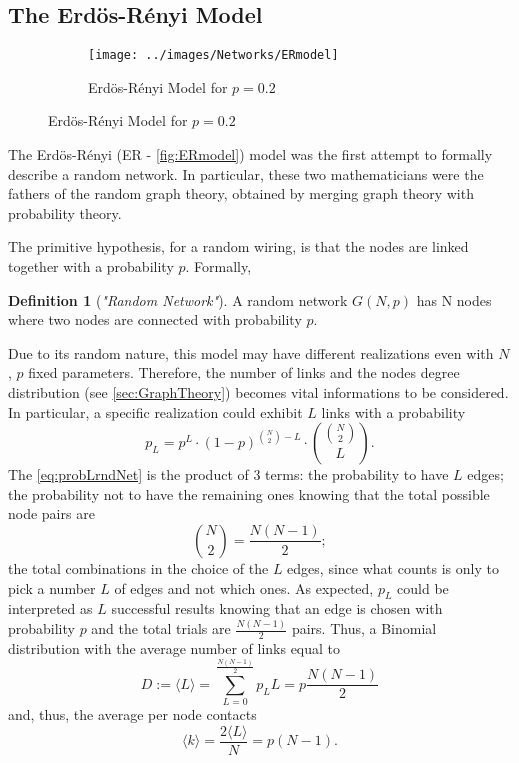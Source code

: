 \documentclass[a4paper,10pt]{book} %
\theoremstyle{definition}
\newtheorem{definition}{Definition}[section]
\begin{document}
\subsection{The Erdös-Rényi Model}
\label{sec:ER_model}

\begin{figure}[ht]
    \begin{subfigure}{\textwidth}
        \texttt{[image: ../images/Networks/ERmodel]}
        \centering
        \caption{Erdös-Rényi Model for $p = 0.2$ \cite{Baronchelli:2017_EpidSpreadCompNets}}
        \label{fig:ERmodel}
    \end{subfigure}
\end{figure}

The Erdös-Rényi (ER - \autoref{fig:ERmodel}) model was the first attempt to formally describe a random network. 
In particular, these two mathematicians were the fathers of the random graph theory, obtained by merging graph theory with probability theory.

The primitive hypothesis, for a random wiring, is that the nodes are linked together with a probability $p$. Formally,

\begin{definition}[\textit{"Random Network"}]
A random network $G(N,p)$ has N nodes where two nodes are connected with probability $p$.
\end{definition} 

Due to its random nature, this model may have different realizations even with $N$, $p$ fixed parameters. Therefore, the number of links and the nodes degree distribution (see \autoref{sec:GraphTheory}) becomes vital informations to be considered.
In particular, a specific realization could exhibit $L$ links with a probability
\begin{equation}
	\label{eq:probLrndNet}
	p_L = p^L \cdot (1-p)^{ \binom{N}{2} - L } \cdot \binom{\binom{N}{2}}{L}.
\end{equation}
The \autoref{eq:probLrndNet} is the product of $3$ terms: the probability to have $L$ edges; the probability not to have the remaining ones knowing that the total possible node pairs are \[ \binom{N}{2} = \frac{N(N-1)}{2}; \] the total combinations in the choice of the $L$ edges, since what counts is only to pick a number $L$ of edges and not which ones.
As expected, $p_L$ could be interpreted as $L$ successful results knowing that an edge is chosen with probability $p$ and the total trials are $\frac{N(N-1)}{2}$ pairs. Thus, a Binomial distribution with the average number of links equal to
\[ D:= \langle L \rangle = \sum_{L = 0}^{\frac{N(N-1)}{2}} p_L L = p\frac{N(N-1)}{2} \label{eq:meanL} \] and, thus, the average per node contacts \[ \langle k\rangle = \frac{2\langle L \rangle}{N} = p(N-1) \label{eq:meank}. \]
\end{document}
